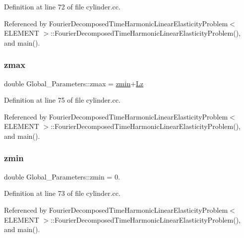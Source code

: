 Definition at line 72 of file cylinder.\+cc.



Referenced by Fourier\+Decomposed\+Time\+Harmonic\+Linear\+Elasticity\+Problem$<$ E\+L\+E\+M\+E\+N\+T $>$\+::\+Fourier\+Decomposed\+Time\+Harmonic\+Linear\+Elasticity\+Problem(), and main().

\mbox{\label{namespaceGlobal__Parameters_a8ee2afb91b9b105939f19a0efa8e1441}} 
\subsubsection{\texorpdfstring{zmax}{zmax}}
{\footnotesize\ttfamily double Global\+\_\+\+Parameters\+::zmax = \hyperlink{namespaceGlobal__Parameters_ac6a17dbcf1b8f1136a1ec5c07efef708}{zmin}+\hyperlink{namespaceGlobal__Parameters_a2bcf0bd846d839f1e3bb04a6c0a612c1}{Lz}}



Definition at line 75 of file cylinder.\+cc.



Referenced by Fourier\+Decomposed\+Time\+Harmonic\+Linear\+Elasticity\+Problem$<$ E\+L\+E\+M\+E\+N\+T $>$\+::\+Fourier\+Decomposed\+Time\+Harmonic\+Linear\+Elasticity\+Problem(), and main().

\mbox{\label{namespaceGlobal__Parameters_ac6a17dbcf1b8f1136a1ec5c07efef708}} 
\subsubsection{\texorpdfstring{zmin}{zmin}}
{\footnotesize\ttfamily double Global\+\_\+\+Parameters\+::zmin = 0.}



Definition at line 73 of file cylinder.\+cc.



Referenced by Fourier\+Decomposed\+Time\+Harmonic\+Linear\+Elasticity\+Problem$<$ E\+L\+E\+M\+E\+N\+T $>$\+::\+Fourier\+Decomposed\+Time\+Harmonic\+Linear\+Elasticity\+Problem(), and main().

